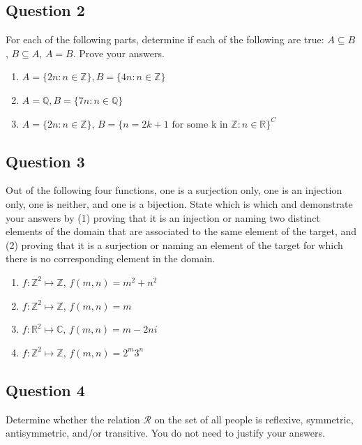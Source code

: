 \documentclass{article}
\begin{document}
\subsection*{Question 2}
For each of the following parts, determine if each of the following are true: $A \subseteq B$, $B \subseteq A$, $A = B$. Prove your answers. 
\begin{enumerate}
    \item $A = \{2n : n \in \mathbb{Z} \}, B = \{4n : n \in \mathbb{Z} \}$
    \item $A = \mathbb{Q}, B = \{7n : n \in \mathbb{Q}\}$
    \item $A = \{2n : n \in \mathbb{Z}\}$, $B = \{n = 2k + 1 \text{ for some k in }\mathbb{Z} : n \in \mathbb{R} \}^C$
\end{enumerate}

\subsection*{Question 3}
Out of the following four functions, one is a surjection only, one is an injection only, one is neither, and one is a bijection. State which is which and demonstrate your answers by (1) proving
that it is an injection or naming two distinct elements of the domain that are associated to the
same element of the target, and (2) proving that it is a surjection or naming an element of the
target for which there is no corresponding element in the domain.
\begin{enumerate}
    \item $f: \mathbb{Z}^2 \mapsto \mathbb{Z}$, $f(m, n) = m^2 + n^2$
    \item $f: \mathbb{Z}^2 \mapsto \mathbb{Z}$, $f(m, n) = m$
    \item $f: \mathbb{R}^2 \mapsto \mathbb{C}$, $f(m, n) = m - 2ni$
    \item $f: \mathbb{Z}^2 \mapsto \mathbb{Z}$, $f(m, n) = 2^m3^n$
\end{enumerate}


\subsection*{Question 4}
Determine whether the relation $\mathcal{R}$ on the set of all people is reflexive, symmetric, antisymmetric, and/or transitive. You do not need to justify your answers.\\
\end{document}
